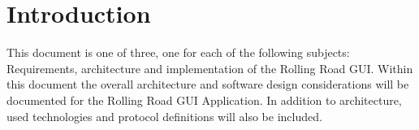 \chapter{Introduction}

This document is one of three, one for each of the following subjects: Requirements, architecture and implementation of the Rolling Road GUI. Within this document the overall architecture and software design considerations will be documented for the Rolling Road GUI Application. In addition to architecture, used technologies and protocol definitions will also be included.